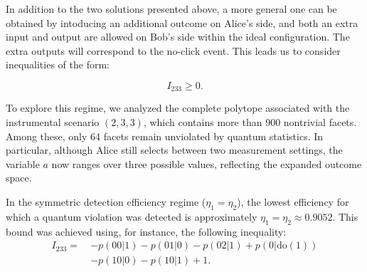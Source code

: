\documentclass[aps,pra,reprint, superscriptaddress,showkeys]{revtex4-2}
\theoremstyle{plain}
\begin{document}
            \label{fig7}

In addition to the two solutions presented above, a more general one can be obtained by intoducing an additional outcome  on Alice’s side, and both an extra input and output are allowed on Bob’s side within the ideal configuration. The extra outputs will correspond to the no-click event.  This leads us to consider inequalities of the form:

\begin{equation}
I_{233} \geq 0.
\end{equation}

To explore this regime, we analyzed the complete polytope associated with the instrumental scenario $(2,3,3)$, which contains more than 900 nontrivial facets. Among these, only 64 facets remain unviolated by quantum statistics. In particular, although Alice still selects between two measurement settings, the variable $a$ now ranges over three possible values, reflecting the expanded outcome space.

In the symmetric detection efficiency regime ($\eta_1 = \eta_2$), the lowest efficiency for which a quantum violation was detected is approximately $\eta_1 = \eta_2 \approx 0.9052$. This bound was achieved using, for instance, the following inequality:
\begin{equation}
\begin{aligned}\label{eq31}
I_{233} =\ & -p(00 | 1) - p(01 | 0) - p(02 | 1) + p(0 | \text{do}(1)) \\
           & - p(10 | 0) - p(10 | 1) + 1.
\end{aligned}
\end{equation}
\end{document}
